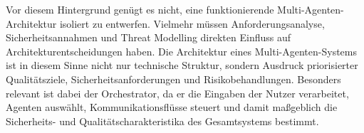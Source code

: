 \newpage

Vor diesem Hintergrund genügt es nicht, eine funktionierende Multi-Agenten-Architektur isoliert zu entwerfen. Vielmehr müssen Anforderungsanalyse, Sicherheitsannahmen und Threat Modelling direkten Einfluss auf Architekturentscheidungen haben. Die Architektur eines Multi-Agenten-Systems ist in diesem Sinne nicht nur technische Struktur, sondern Ausdruck priorisierter Qualitätsziele, Sicherheitsanforderungen und Risikobehandlungen. Besonders relevant ist dabei der Orchestrator, da er die Eingaben der Nutzer verarbeitet, Agenten auswählt, Kommunikationsflüsse steuert und damit maßgeblich die Sicherheits- und Qualitätscharakteristika des Gesamtsystems bestimmt.

%
%
%

